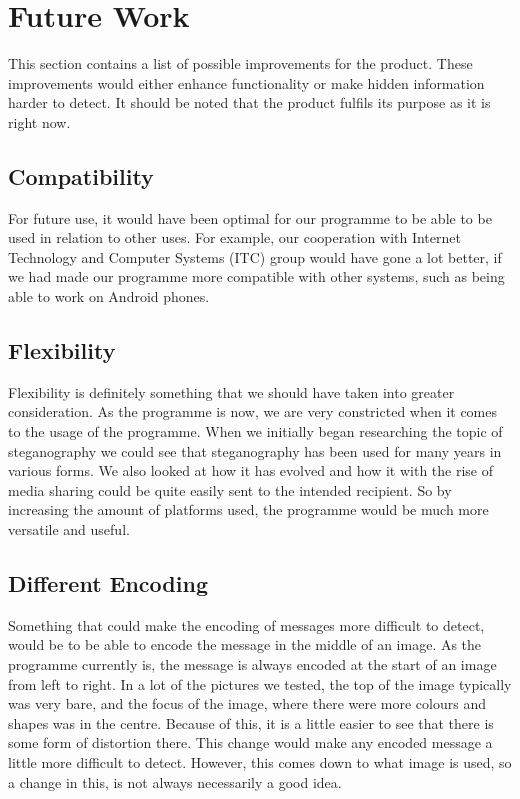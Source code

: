 \section{Future Work}
This section contains a list of possible improvements for the product.
These improvements would either enhance functionality or make hidden information harder to detect.
It should be noted that the product fulfils its purpose as it is right now.

\subsection*{Compatibility}
For future use, it would have been optimal for our programme to be able to be used in relation to other uses.
For example, our cooperation with Internet Technology and Computer Systems (ITC) group would have gone a lot better, if we had made our programme more compatible with other systems, such as being able to work on Android phones.

\subsection*{Flexibility}
Flexibility is definitely something that we should have taken into greater consideration.
As the programme is now, we are very constricted when it comes to the usage of the programme.
When we initially began researching the topic of steganography we could see that steganography has been used for many years in various forms.
We also looked at how it has evolved and how it with the rise of media sharing could be quite easily sent to the intended recipient.
So by increasing the amount of platforms used, the programme would be much more versatile and useful.

\subsection*{Different Encoding}
Something that could make the encoding of messages more difficult to detect, would be to be able to encode the message in the middle of an image.
As the programme currently is,  the message is always encoded at the start of an image from left to right.
In a lot of the pictures we tested, the top of the image typically was very bare, and the focus of the image, where there were more colours and shapes was in the centre.
Because of this, it is a little easier to see that there is some form of distortion there.
This change would make any encoded message a little more difficult to detect.
However, this comes down to what image is used, so a change in this, is not always necessarily a good idea.

